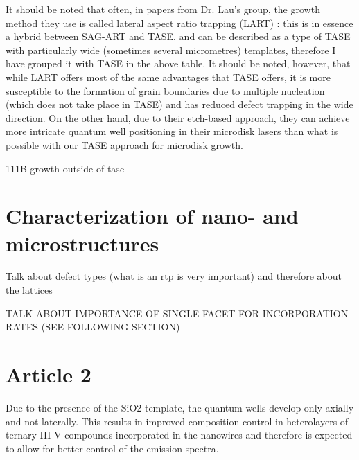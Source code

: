 It should be noted that often, in papers from Dr. Lau’s group, the growth method they use is called lateral aspect ratio trapping (LART) \cite{Han2020, Yan2021}: this is in essence a hybrid between SAG-ART and TASE, and can be described as a type of TASE with particularly wide (sometimes several micrometres) templates, therefore I have grouped it with TASE in the above table. It should be noted, however, that while LART offers most of the same advantages that TASE offers, it is more susceptible to the formation of grain boundaries due to multiple nucleation (which does not take place in TASE) and has reduced defect trapping in the wide direction. On the other hand, due to their etch-based approach, they can achieve more intricate quantum well positioning in their microdisk lasers than what is possible with our TASE approach for microdisk growth.



111B growth outside of tase

\section{Characterization of nano- and microstructures}
Talk about defect types (what is an rtp is very important) and therefore about the lattices

TALK ABOUT IMPORTANCE OF SINGLE FACET FOR INCORPORATION RATES (SEE FOLLOWING SECTION)

\section{Article 2}

Due to the presence of the SiO2 template, the quantum wells
develop only axially and not laterally. This results in improved
composition control in heterolayers of ternary III-V
compounds incorporated in the nanowires\cite{Borg2019} and therefore is
expected to allow for better control of the emission spectra.
